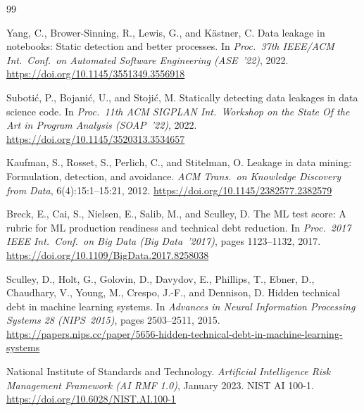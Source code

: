 \documentclass[11pt,a4paper]{article}
\begin{document}
\begingroup
\renewcommand{\section}[2]{}
\begin{thebibliography}{99}

Yang, C., Brower-Sinning, R., Lewis, G., and K\"{a}stner, C.
\newblock Data leakage in notebooks: Static detection and better processes.
\newblock In \emph{Proc.\ 37th IEEE/ACM Int.\ Conf.\ on Automated Software Engineering (ASE~'22)}, 2022.
\newblock \url{https://doi.org/10.1145/3551349.3556918}

Subotić, P., Bojanić, U., and Stojić, M.
\newblock Statically detecting data leakages in data science code.
\newblock In \emph{Proc.\ 11th ACM SIGPLAN Int.\ Workshop on the State Of the Art in Program Analysis (SOAP~'22)}, 2022.
\newblock \url{https://doi.org/10.1145/3520313.3534657}

Kaufman, S., Rosset, S., Perlich, C., and Stitelman, O.
\newblock Leakage in data mining: Formulation, detection, and avoidance.
\newblock \emph{ACM Trans.\ on Knowledge Discovery from Data}, 6(4):15:1--15:21, 2012.
\newblock \url{https://doi.org/10.1145/2382577.2382579}

Breck, E., Cai, S., Nielsen, E., Salib, M., and Sculley, D.
\newblock The ML test score: A rubric for ML production readiness and technical debt reduction.
\newblock In \emph{Proc.\ 2017 IEEE Int.\ Conf.\ on Big Data (Big Data~'2017)}, pages 1123--1132, 2017.
\newblock \url{https://doi.org/10.1109/BigData.2017.8258038}

Sculley, D., Holt, G., Golovin, D., Davydov, E., Phillips, T., Ebner, D., Chaudhary, V., Young, M., Crespo, J.-F., and Dennison, D.
\newblock Hidden technical debt in machine learning systems.
\newblock In \emph{Advances in Neural Information Processing Systems 28 (NIPS~2015)}, pages 2503--2511, 2015.
\newblock \url{https://papers.nips.cc/paper/5656-hidden-technical-debt-in-machine-learning-systems}

National Institute of Standards and Technology.
\newblock \emph{Artificial Intelligence Risk Management Framework (AI RMF 1.0)}, January 2023.
\newblock NIST AI 100-1.
\newblock \url{https://doi.org/10.6028/NIST.AI.100-1}

\end{thebibliography}
\endgroup
\end{document}
